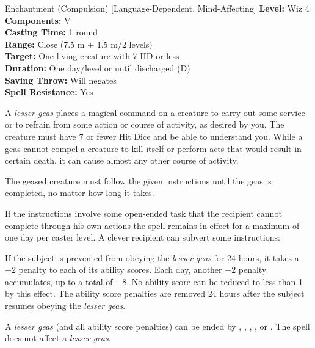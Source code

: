 {Enchantment (Compulsion) [Language-Dependent, Mind-Affecting]}
{
	\textbf{Level:}
	Wiz 4\\
	\textbf{Components:}
	V\\
	\textbf{Casting Time:}
	1 round\\
	\textbf{Range:}
	Close (7.5 m + 1.5 m/2 levels)\\
	\textbf{Target:}
	One living creature with 7 HD or less\\
	\textbf{Duration:}
	One day/level or until discharged (D)\\
	\textbf{Saving Throw:}
	Will negates\\
	\textbf{Spell Resistance:}
	Yes\\
}
{
	A \emph{lesser geas} places a magical command on a creature to carry out some service or to refrain from some action or course of activity, as desired by you. The creature must have 7 or fewer Hit Dice and be able to understand you. While a geas cannot compel a creature to kill itself or perform acts that would result in certain death, it can cause almost any other course of activity.

	The geased creature must follow the given instructions until the geas is completed, no matter how long it takes.

	If the instructions involve some open-ended task that the recipient cannot complete through his own actions the spell remains in effect for a maximum of one day per caster level. A clever recipient can subvert some instructions:

	If the subject is prevented from obeying the \emph{lesser geas} for 24 hours, it takes a $-2$ penalty to each of its ability scores. Each day, another $-2$ penalty accumulates, up to a total of $-8$. No ability score can be reduced to less than 1 by this effect. The ability score penalties are removed 24 hours after the subject resumes obeying the \emph{lesser geas}.

	A \emph{lesser geas} (and all ability score penalties) can be ended by , , , , or . The  spell does not affect a \emph{lesser geas}.

}
